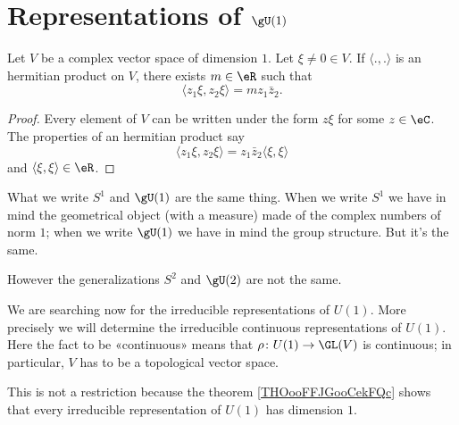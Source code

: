 \section{Representations of \( \gU(1)\)}

\begin{proposition}
    Let \( V\) be a complex vector space of dimension \( 1\). Let \( \xi\neq 0\in V\). If \( \langle ., .\rangle \) is an hermitian product on \( V\), there exists \( m\in \eR\) such that
    \begin{equation}
        \langle z_1\xi, z_2\xi\rangle =mz_1\bar z_2.
    \end{equation}
\end{proposition}

\begin{proof}
    Every element of \( V\) can be written under the form \( z\xi\) for some \( z\in \eC\). The properties of an hermitian product say
    \begin{equation}
        \langle z_1\xi, z_2\xi\rangle =z_1\bar z_2\langle \xi, \xi\rangle 
    \end{equation}
    and \( \langle \xi, \xi\rangle \in \eR\).
\end{proof}

\begin{normaltext}
    What we write \( S^1\) and \( \gU(1)\) are the same thing. When we write \( S^1\) we have in mind the geometrical object (with a measure) made of the complex numbers of norm \( 1\); when we write \( \gU(1)\) we have in mind the group structure. But it's the same.

    However the generalizations \( S^2\) and \( \gU(2)\) are not the same.
\end{normaltext}

\begin{normaltext}
    We are searching now for the irreducible representations of \( U(1)\). More precisely we will determine the irreducible continuous representations of \( U(1)\). Here the fact to be «continuous» means that \( \rho\colon U(1)\to \GL(V)\) is continuous; in particular, \( V\) has to be a topological vector space.

    This is not a restriction because the theorem \ref{THOooFFJGooCekFQc} shows that every irreducible representation of \( U(1)\) has dimension \( 1\).
\end{normaltext}

